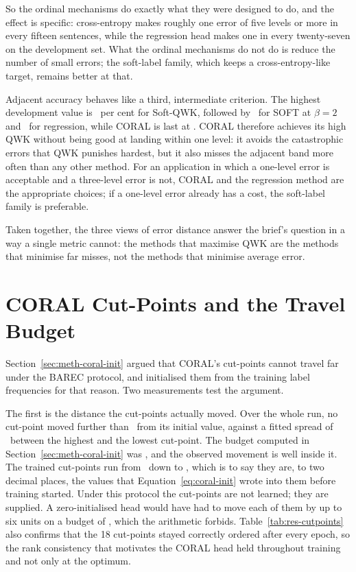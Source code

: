 So the ordinal mechanisms do exactly what they were designed to do, and the effect is specific:
cross-entropy makes roughly one error of five levels or more in every fifteen sentences, while
the regression head makes one in every twenty-seven on the development set. What the ordinal
mechanisms do not do is reduce the number of small errors; the soft-label family, which keeps a
cross-entropy-like target, remains better at that.

Adjacent accuracy behaves like a third, intermediate criterion. The highest development value is
\devPmSoftqwk\ per cent for Soft-QWK, followed by \devPmSoftTwo\ for SOFT at $\beta=2$ and
\devPmMSE\ for regression, while CORAL is last at \devPmCoral. CORAL therefore achieves its
high QWK without being good at landing within one level: it avoids the catastrophic errors that
QWK punishes hardest, but it also misses the adjacent band more often than any other method.
For an application in which a one-level error is acceptable and a three-level error is not,
CORAL and the regression method are the appropriate choices; if a one-level error already has a
cost, the soft-label family is preferable.

Taken together, the three views of error distance answer the brief's question in a way a single
metric cannot: the methods that maximise QWK are the methods that minimise far misses, not the
methods that minimise average error.

\section{CORAL Cut-Points and the Travel Budget}
\label{sec:res-cutpoints}

Section~\ref{sec:meth-coral-init} argued that CORAL's cut-points cannot travel far under the
BAREC protocol, and initialised them from the training label frequencies for that reason. Two
measurements test the argument.

The first is the distance the cut-points actually moved. Over the whole run, no cut-point moved
further than \cutMoveFineCoral\ from its initial value, against a fitted spread of
\cutSpreadCoral\ between the highest and the lowest cut-point. The budget computed in
Section~\ref{sec:meth-coral-init} was \lrSumEncoder, and the observed movement is well inside
it. The trained cut-points run from \cutTopCoral\ down to \cutBottomCoral, which is to say they
are, to two decimal places, the values that Equation~\ref{eq:coral-init} wrote into them before
training started. Under this protocol the cut-points are not learned; they are supplied. A
zero-initialised head would have had to move each of them by up to six units on a budget of
\lrSumEncoder, which the arithmetic forbids. Table~\ref{tab:res-cutpoints} also confirms that
the 18 cut-points stayed correctly ordered after every epoch, so the rank consistency that
motivates the CORAL head held throughout training and not only at the optimum.

